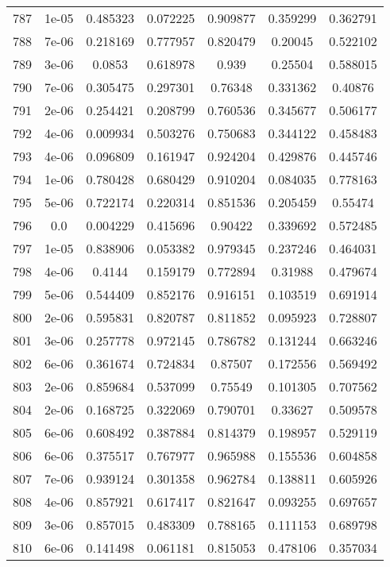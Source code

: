 \begin{table}
\begin{tabular*}{\linewidth}{c|c|c|c|c|c|c}
787 & 1e-05 & 0.485323 & 0.072225 & 0.909877 & 0.359299 & 0.362791\\
788 & 7e-06 & 0.218169 & 0.777957 & 0.820479 & 0.20045 & 0.522102\\
789 & 3e-06 & 0.0853 & 0.618978 & 0.939 & 0.25504 & 0.588015\\
790 & 7e-06 & 0.305475 & 0.297301 & 0.76348 & 0.331362 & 0.40876\\
791 & 2e-06 & 0.254421 & 0.208799 & 0.760536 & 0.345677 & 0.506177\\
792 & 4e-06 & 0.009934 & 0.503276 & 0.750683 & 0.344122 & 0.458483\\
793 & 4e-06 & 0.096809 & 0.161947 & 0.924204 & 0.429876 & 0.445746\\
794 & 1e-06 & 0.780428 & 0.680429 & 0.910204 & 0.084035 & 0.778163\\
795 & 5e-06 & 0.722174 & 0.220314 & 0.851536 & 0.205459 & 0.55474\\
796 & 0.0 & 0.004229 & 0.415696 & 0.90422 & 0.339692 & 0.572485\\
797 & 1e-05 & 0.838906 & 0.053382 & 0.979345 & 0.237246 & 0.464031\\
798 & 4e-06 & 0.4144 & 0.159179 & 0.772894 & 0.31988 & 0.479674\\
799 & 5e-06 & 0.544409 & 0.852176 & 0.916151 & 0.103519 & 0.691914\\
800 & 2e-06 & 0.595831 & 0.820787 & 0.811852 & 0.095923 & 0.728807\\
801 & 3e-06 & 0.257778 & 0.972145 & 0.786782 & 0.131244 & 0.663246\\
802 & 6e-06 & 0.361674 & 0.724834 & 0.87507 & 0.172556 & 0.569492\\
803 & 2e-06 & 0.859684 & 0.537099 & 0.75549 & 0.101305 & 0.707562\\
804 & 2e-06 & 0.168725 & 0.322069 & 0.790701 & 0.33627 & 0.509578\\
805 & 6e-06 & 0.608492 & 0.387884 & 0.814379 & 0.198957 & 0.529119\\
806 & 6e-06 & 0.375517 & 0.767977 & 0.965988 & 0.155536 & 0.604858\\
807 & 7e-06 & 0.939124 & 0.301358 & 0.962784 & 0.138811 & 0.605926\\
808 & 4e-06 & 0.857921 & 0.617417 & 0.821647 & 0.093255 & 0.697657\\
809 & 3e-06 & 0.857015 & 0.483309 & 0.788165 & 0.111153 & 0.689798\\
810 & 6e-06 & 0.141498 & 0.061181 & 0.815053 & 0.478106 & 0.357034\\
\end{tabular*}
\end{table}
